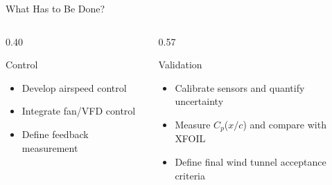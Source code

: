 \documentclass[aspectratio=169,10pt]{beamer}
\newcommand{\Cp}{\ensuremath{C_p}}
\newcommand{\xc}{\ensuremath{x/c}}
\newenvironment{points}{\begin{itemize}\setlength{\itemsep}{0.45em}}{\end{itemize}}
\begin{document}
\begin{frame}{What Has to Be Done?}
\begin{columns}[T,onlytextwidth]
\begin{column}{0.40\textwidth}
\begin{block}{Control}
\begin{points}
          \item Develop airspeed control
          \item Integrate fan/VFD control
          \item Define feedback measurement
        \end{points}
      \end{block}
    \end{column}
    \begin{column}{0.57\textwidth}
      \begin{block}{Validation}
        \begin{points}
          \item Calibrate sensors and quantify uncertainty
          \item Measure \Cp(\xc) and compare with XFOIL
          \item Define final wind tunnel acceptance criteria
        \end{points}
      \end{block}
    \end{column}
  \end{columns}
\end{frame}
\end{document}
